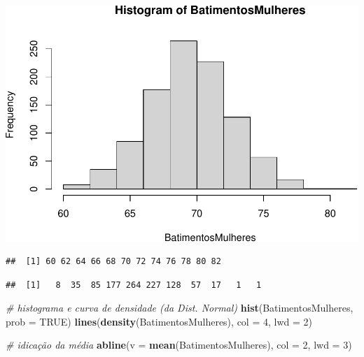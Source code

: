 \documentclass[
]{book}
\newenvironment{Shaded}{\begin{snugshade}}{\end{snugshade}}
\newcommand{\AttributeTok}[1]{\textcolor[rgb]{0.13,0.29,0.53}{#1}}
\newcommand{\CommentTok}[1]{\textcolor[rgb]{0.56,0.35,0.01}{\textit{#1}}}
\newcommand{\ConstantTok}[1]{\textcolor[rgb]{0.56,0.35,0.01}{#1}}
\newcommand{\DecValTok}[1]{\textcolor[rgb]{0.00,0.00,0.81}{#1}}
\newcommand{\FunctionTok}[1]{\textcolor[rgb]{0.13,0.29,0.53}{\textbf{#1}}}
\newcommand{\NormalTok}[1]{#1}
\newcommand{\SpecialCharTok}[1]{\textcolor[rgb]{0.81,0.36,0.00}{\textbf{#1}}}
\begin{document}
\includegraphics{LivroEstatisticaR_files/figure-latex/unnamed-chunk-23-1.pdf}

\begin{Shaded}
\end{Shaded}

\begin{verbatim}
##  [1] 60 62 64 66 68 70 72 74 76 78 80 82
\end{verbatim}

\begin{Shaded}
\end{Shaded}

\begin{verbatim}
##  [1]   8  35  85 177 264 227 128  57  17   1   1
\end{verbatim}

\begin{Shaded}
\begin{Highlighting}[]
\CommentTok{\# histograma e curva de densidade (da Dist. Normal)}
\FunctionTok{hist}\NormalTok{(BatimentosMulheres, }\AttributeTok{prob =} \ConstantTok{TRUE}\NormalTok{)}
\FunctionTok{lines}\NormalTok{(}\FunctionTok{density}\NormalTok{(BatimentosMulheres), }\AttributeTok{col =} \DecValTok{4}\NormalTok{, }\AttributeTok{lwd =} \DecValTok{2}\NormalTok{)}

\CommentTok{\# idicação da média}
\FunctionTok{abline}\NormalTok{(}\AttributeTok{v =} \FunctionTok{mean}\NormalTok{(BatimentosMulheres), }\AttributeTok{col =} \DecValTok{2}\NormalTok{, }\AttributeTok{lwd =} \DecValTok{3}\NormalTok{)}
\end{Highlighting}
\end{Shaded}
\end{document}
